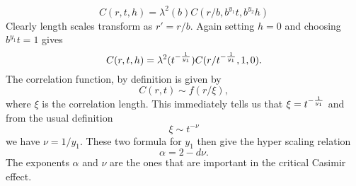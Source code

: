 \begin{equation}
C(r,t,h) = \lambda^2(b) C(r/b, b^{y_1}t,  b^{y_2} h)
\end{equation}
Clearly length scales transform as $r' = r/b$. Again setting $h=0$ and choosing $b^{y_1}t=1$ gives
\begin{equation}
C(r,t,h) = \lambda^2(t^{-{1\over y_1}}) C(r/t^{-{1\over y_1}}, 1, 0).
\end{equation}
The correlation function, by definition is given by
\begin{equation}
C(r,t) \sim f(r/\xi),
\end{equation}
where $\xi$ is the correlation length. This immediately tells us that $\xi = t^{-{1\over y_1}}$ and from the usual definition 
\begin{equation}
\xi \sim t^{-\nu}
\end{equation}
we have $\nu = 1/y_1$.  These two formula for $y_1$ then give the hyper scaling relation
\begin{equation}
\alpha = 2-d\nu.
\end{equation}
The exponents $\alpha$ and $\nu$ are the ones that are important in the critical Casimir effect.
